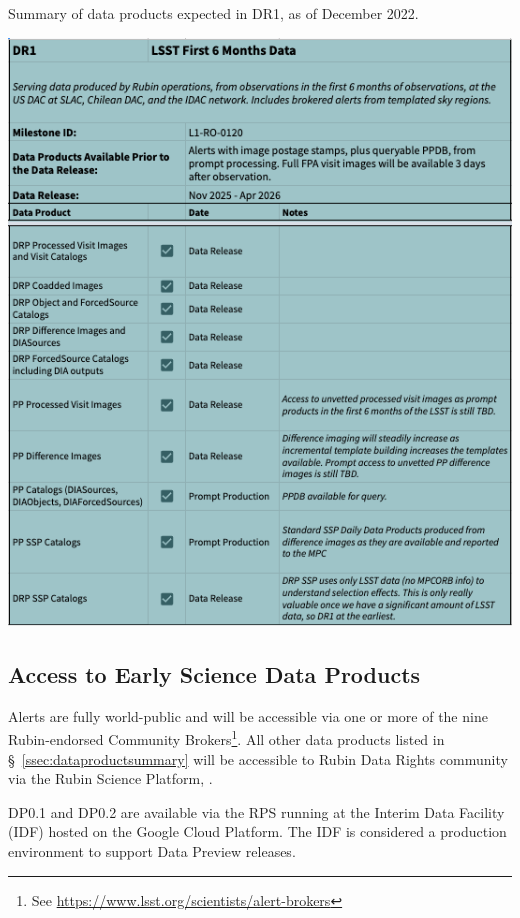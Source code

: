 \begin{table}
\caption{Summary of data products expected in DR1, as of December 2022.}
\label{tab:dr-one-products}
\includegraphics[width=\linewidth]{figures/DR1-products}
\end{table}


\subsection{Access to Early Science  Data Products} \label{ssec:dataaccess}
Alerts are fully world-public and will be accessible via one or more of the nine Rubin-endorsed Community Brokers\footnote{See \url{https://www.lsst.org/scientists/alert-brokers}}.
All other data products listed in \S~\ref{ssec:dataproductsummary} will be accessible to Rubin Data Rights community via the Rubin Science Platform, \citep{LSE-319}.

DP0.1 and DP0.2 are available via the RPS running at the Interim Data Facility (IDF) hosted on the Google Cloud Platform.
The IDF is considered a production environment to support Data Preview releases.
